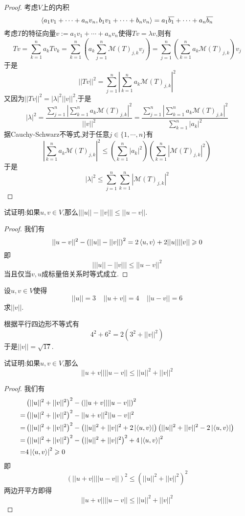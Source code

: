 \documentclass{ctexart}
\begin{document}
\begin{proof}
    考虑$V$上的内积
    \[\left\langle{a_1v_1+\cdots+a_nv_n},{b_1v_1+\cdots+b_nv_n}\right\rangle=a_1\overline{b_1}+\cdots+a_n\overline{b_n}\]
    考虑$T$的特征向量$v:=a_1v_1+\cdots+a_nv_n$使得$Tv=\lambda v$,则有
    \[Tv=\sum_{k=1}^{n}a_kTv_k=\sum_{k=1}^n\left(a_k\sum_{j=1}^n\mathcal{M}(T)_{j,k}v_j\right)=\sum_{j=1}^n\left(\sum_{k=1}^{n}a_k\mathcal{M}(T)_{j,k}\right)v_j\]
    于是
    \[||Tv||^2=\sum_{j=1}^{n}\left|\sum_{k=1}^{n}a_k\mathcal{M}(T)_{j,k}\right|^2\]
    又因为$||Tv||^2=|\lambda|^2||v||^2$,于是
    \[|\lambda|^2=\dfrac{\displaystyle\sum_{j=1}^{n}\left|\sum_{k=1}^{n}a_k\mathcal{M}(T)_{j,k}\right|^2}{||v||^2}=\dfrac{\displaystyle\sum_{j=1}^{n}\left|\sum_{k=1}^{n}a_k\mathcal{M}(T)_{j,k}\right|^2}{\displaystyle\sum_{k=1}^{n}|a_k|^2}\]
    据Cauchy-Schwarz不等式,对于任意$j\in\{1,\cdots,n\}$有
    \[\left|\sum_{k=1}^{n}a_k\mathcal{M}(T)_{j,k}\right|^2\leqslant\left(\sum_{k=1}^{n}\left|a_k\right|^2\right)\left(\sum_{k=1}^{n}\left|\mathcal{M}(T)_{j,k}\right|^2\right)\]
    于是
    \[|\lambda|^2\leqslant\sum_{j=1}^n\sum_{k=1}^n\left|\mathcal{M}(T)_{j,k}\right|^2\]
\end{proof}
\begin{problem}[20.]
    试证明:如果$u,v\in V$,那么$\left|||u||-||v||\right|\leqslant||u-v||$.
\end{problem}
\begin{proof}
    我们有
    \[||u-v||^2-\left(||u||-||v||\right)^2=2\left\langle{u},{v}\right\rangle+2||u||||v||\geqslant0\]
    即
    \[\left|||u||-||v||\right|\leqslant||u-v||^2\]
    当且仅当$v,u$成标量倍关系时等式成立.
\end{proof}
\begin{problem}[21.]
    设$u,v\in V$使得
    \[||u||=3\ \ \ \ \ ||u+v||=4\ \ \ \ \ ||u-v||=6\]
    求$||v||$.
\end{problem}
\begin{solution}
    根据平行四边形不等式有
    \[4^2+6^2=2\left(3^2+||v||^2\right)\]
    于是$||v||=\sqrt{17}$.
\end{solution}
\begin{problem}[22.]
    试证明:如果$u,v\in V$,那么
    \[||u+v||||u-v||\leqslant||u||^2+||v||^2\]
\end{problem}
\begin{proof}
    我们有
    \[\begin{aligned}
        &\left(||u||^2+||v||^2\right)^2-\left(||u+v||||u-v||\right)^2\\
        =&\left(||u||^2+||v||^2\right)^2-||u+v||^2||u-v||^2\\
        =&\left(||u||^2+||v||^2\right)^2-\left(||u||^2+||v||^2+2\left|\left\langle{u},{v}\right\rangle\right|\right)\left(||u||^2+||v||^2-2\left|\left\langle{u},{v}\right\rangle\right|\right) \\
        =&\left(||u||^2+||v||^2\right)^2-\left(||u||^2+||v||^2\right)^2+4\left|\left\langle{u},{v}\right\rangle\right|^2 \\
        =&4\left|\left\langle{u},{v}\right\rangle\right|^2\geqslant0
    \end{aligned}\]
    即
    \[\left(||u+v||||u-v||\right)^2\leqslant\left(||u||^2+||v||^2\right)^2\]
    两边开平方即得
    \[||u+v||||u-v||\leqslant||u||^2+||v||^2\]
\end{proof}
\end{document}
